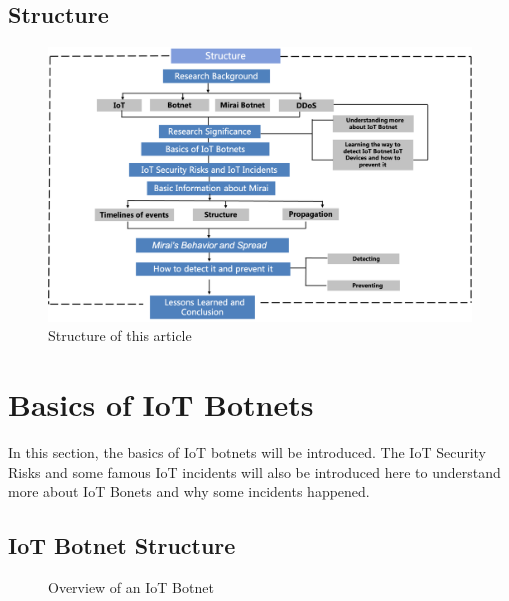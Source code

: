\documentclass[conference]{IEEEtran}
\begin{document}
\subsection{\textbf{Structure}}
\begin{figure}[htbp]
\centerline{\includegraphics[scale=0.242]{structure.png}}
\caption{Structure of this article}
\label{fig}
\end{figure}

%


\section{\textbf{Basics of IoT Botnets }}
In this section, the basics of IoT botnets will be introduced. The IoT Security Risks and some famous IoT incidents will also be introduced here to understand more about IoT Bonets and why some incidents happened.
\subsection{\textbf{IoT Botnet Structure}}
\begin{figure}[htbp]
\caption{Overview of an IoT Botnet\cite{b3}}
\label{fig}
\end{figure}
\end{document}
